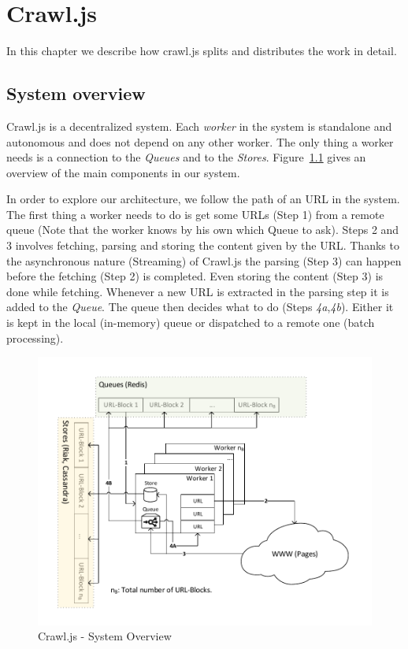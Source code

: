 
\chapter{Crawl.js} %
In this chapter we describe how crawl.js splits and distributes the work in detail.
\label{Chapter4} 

\section{System overview}
Crawl.js is a decentralized system. Each \emph{worker} in the system is standalone and autonomous and does not depend on any other worker. The only thing a worker needs is a connection to the \emph{Queues} and to the \emph{Stores}. Figure~\ref{system_overview} gives an overview of the main components in our system.

In order to explore our architecture, we follow the path of an URL in the system.
The first thing a worker needs to do is get some URLs (Step 1) from a remote queue (Note that the worker knows by his own which Queue to ask). Steps 2 and 3 involves fetching, parsing and storing the content given by the URL. Thanks to the asynchronous nature (Streaming) of Crawl.js the parsing (Step 3) can happen before the fetching (Step 2) is completed. Even storing the content (Step 3) is done while fetching. Whenever a new URL is extracted in the parsing step it is added to the \emph{Queue}. The queue then decides what to do (Steps \emph{4a},\emph{4b}). Either it is kept in the local (in-memory) queue or dispatched to a remote one (batch processing).

\begin{figure}[h]
\centering
  \includegraphics[width=1\textwidth]{Figures/system_overview.pdf}
\caption{Crawl.js - System Overview}
\label{system_overview}
\end{figure}

